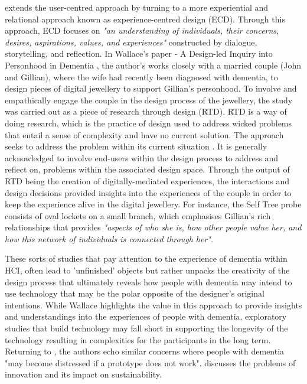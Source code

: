 \cite{wallace_enabling_2012-1wallace_design-led_2013} extends the user-centred approach by turning to a more experiential and relational approach known as experience-centred design (ECD). Through this approach, ECD focuses on \textit{"an understanding of individuals, their concerns, desires, aspirations, values, and experiences"} \citep{morrissey_value_2017} constructed by dialogue, storytelling, and reflection. In Wallace's paper - A Design-led Inquiry into Personhood in Dementia \citep{wallace_design-led_2013}, the author's works closely with a married couple (John and Gillian), where the wife had recently been diagnosed with dementia, to design pieces of digital jewellery to support Gillian's personhood. To involve and empathically engage the couple in the design process of the jewellery, the study was carried out as a piece of research through design (RTD). RTD is a way of doing research, which is the practice of design used to address wicked problems that entail a sense of complexity and have no current solution. The approach seeks to address the problem within its current situation \citep{zimmerman_research_2007}. It is generally acknowledged to involve end-users within the design process to address and reflect on, problems within the associated design space. Through the output of RTD being the creation of digitally-mediated experiences, the interactions and design decisions provided \cite{wallace_design-led_2013} insights into the experiences of the couple in order to keep the experience alive in the digital jewellery. For instance, the Self Tree probe consists of oval lockets on a small branch, which emphasises Gillian's rich relationships that provides \textit{"aspects of who she is, how other people value her, and how this network of individuals is connected through her"}.

These sorts of studies that pay attention to the experience of dementia within HCI, often lead to 'unfinished' objects but rather unpacks the creativity of the design process that ultimately reveals how people with dementia may intend to use technology that may be the polar opposite of the designer's original intentions. While Wallace highlights the value in this approach to provide insights and understandings into the experiences of people with dementia, exploratory studies that build technology may fall short in supporting the longevity of the technology resulting in complexities for the participants in the long term. Returning to \cite{robinson2009keeping}, the authors echo similar concerns where people with dementia "may become distressed if a prototype does not work". \cite{meurer_designing_2018} discusses the problems of innovation and its impact on sustainability. 

